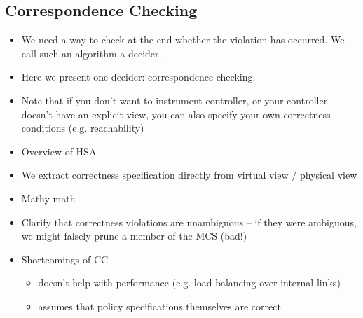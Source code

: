 \subsection{Correspondence Checking}
\begin{itemize}
\item We need a way to check at the end whether the violation has occurred. We call such an algorithm a decider. 
\item Here we present one decider: correspondence checking. 
\item Note that if you don't want to instrument controller, or your controller doesn't have an explicit view, you can also specify your own correctness conditions (e.g. reachability) 
\item Overview of HSA
\item We extract correctness specification directly from virtual view / physical view
\item Mathy math
\item Clarify that correctness violations are unambiguous -- if they were ambiguous, we might falsely prune a member of the MCS (bad!)
\item Shortcomings of CC
  \begin{itemize}
    \item doesn't help with performance (e.g. load balancing over internal links)
    \item assumes that policy specifications themselves are correct
  \end{itemize}
\end{itemize}


